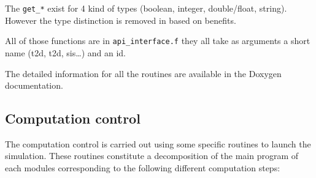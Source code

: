 The \verb!get_*! exist for 4 kind of types (boolean, integer, double/float, string).
However the type distinction is removed in \TelApy{} based on \python{} benefits.

All of those functions are in \verb!api_interface.f! they all take as arguments
a short name (t2d, t2d, sis\ldots) and an id.

The detailed information for all the routines are available in the Doxygen
documentation.

\subsection{Computation control}\label{subsec:exec}

The computation control is carried out using some specific routines to launch
the simulation. These routines constitute a decomposition of the main program
of each \telemacsystem{} modules corresponding to the following different
computation steps:

